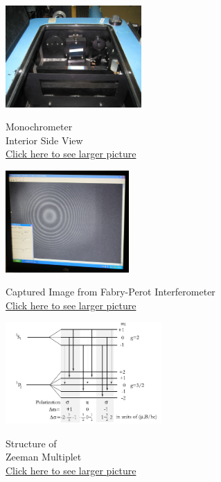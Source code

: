\documentclass{../lab}
\begin{document}
\begin{figure}[H]
\captionsetup{justification=centering}
  \href{http://experimentationlab.berkeley.edu/sites/default/files/images/ATM-mono-Grating_3500-Lg.jpg}{\includegraphics[height=110pt,keepaspectratio]{images/ATM-mono-Grating_3500-Lg.jpg}}
  \caption{Monochrometer \\ Interior Side View\\ \href{http://experimentationlab.berkeley.edu/sites/default/files/images/ATM-mono-Grating_3500-Lg.jpg}{Click here to see larger picture}}
  \label{fig:MonochrometerInteriorSide}
\endminipage\hfill
{}
  \href{http://experimentationlab.berkeley.edu/sites/default/files/images/Atm_5.jpg}{\includegraphics[height=110pt,keepaspectratio]{images/Atm_5.jpg}}
  \caption{Captured Image from Fabry-Perot Interferometer \\
  \href{http://experimentationlab.berkeley.edu/sites/default/files/images/Atm_5.jpg}{Click here to see larger picture}}
  \label{fig:ImagedFringes}
\endminipage\hfill
{}
  \href{http://experimentationlab.berkeley.edu/sites/default/files/Atm1image003.png}{\includegraphics[height=110pt,keepaspectratio]{images/Atm1image003.png}}
  \caption{Structure of \\ Zeeman Multiplet \\ \href{http://experimentationlab.berkeley.edu/sites/default/files/Atm1image003.png}{Click here to see larger picture}}\label{fig:Multiplet}
\endminipage
\end{figure}
\end{document}
